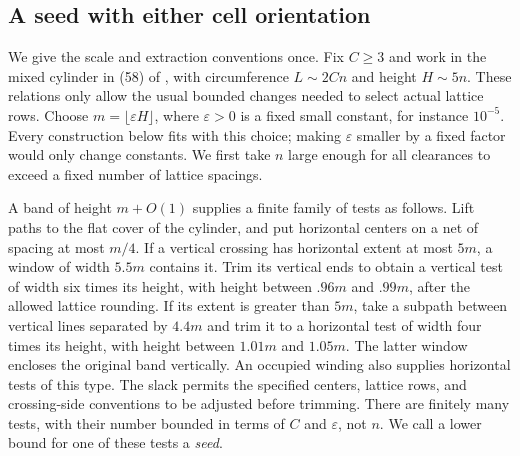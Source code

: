 \subsection{A seed with either cell orientation}

We give the scale and extraction conventions once.  Fix $C\geq3$ and
work in the mixed cylinder in (58) of \cite{GL2025}, with circumference
$L\sim2Cn$ and height $H\sim5n$.  These relations only allow the usual
bounded changes needed to select actual lattice rows.  Choose
$m=\lfloor\varepsilon H\rfloor$, where $\varepsilon>0$ is a fixed small
constant, for instance $10^{-5}$.  Every construction below fits with
this choice; making $\varepsilon$ smaller by a fixed factor would only
change constants.  We first take $n$ large enough for all clearances to
exceed a fixed number of lattice spacings.

A band of height $m+O(1)$ supplies a finite family of tests as follows.
Lift paths to the flat cover of the cylinder, and put horizontal centers
on a net of spacing at most $m/4$.  If a vertical crossing has horizontal
extent at most $5m$, a window of width $5.5m$ contains it.  Trim its
vertical ends to obtain a vertical test of width six times its height,
with height between $.96m$ and $.99m$, after the allowed lattice
rounding.  If its extent is greater than $5m$, take a subpath between
vertical lines separated by $4.4m$ and trim it to a horizontal test
of width four times its height, with height between $1.01m$ and
$1.05m$.  The latter window encloses the original band vertically.
An occupied winding also supplies horizontal tests of this type.  The
slack permits the specified centers, lattice rows, and crossing-side
conventions to be adjusted before trimming.  There are finitely many
tests, with their number bounded in terms of $C$ and $\varepsilon$, not
$n$.  We call a lower bound for one of these tests a \emph{seed}.

